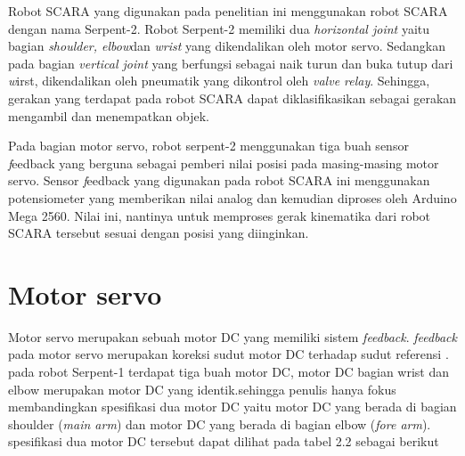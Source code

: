 Robot SCARA yang digunakan pada penelitian ini menggunakan robot SCARA dengan nama Serpent-2. Robot Serpent-2 memiliki dua \textit{horizontal joint} yaitu bagian \textit{shoulder, elbow}dan \textit{wrist} yang dikendalikan oleh motor servo. Sedangkan pada bagian \textit{vertical joint} yang berfungsi sebagai naik turun dan buka tutup dari \emph wirst, dikendalikan oleh pneumatik yang dikontrol oleh \emph {valve relay}. Sehingga, gerakan yang terdapat pada robot SCARA dapat diklasifikasikan sebagai gerakan mengambil dan menempatkan objek. 
\begin{table}[H]
	\centering
	\caption{Spesifikasi Robot Serpent-2}
		\end{table}
		
		Pada bagian motor servo, robot serpent-2 menggunakan tiga buah sensor \emph feedback yang berguna sebagai pemberi nilai posisi pada masing-masing motor servo. Sensor \emph feedback yang digunakan pada robot SCARA ini menggunakan potensiometer yang memberikan nilai analog dan kemudian diproses oleh Arduino Mega 2560. Nilai ini, nantinya untuk memproses gerak kinematika dari robot SCARA tersebut sesuai dengan posisi yang diinginkan.



\section{Motor servo}
	Motor servo merupakan sebuah motor DC yang memiliki sistem \textit{feedback}. \textit{feedback} pada motor servo merupakan koreksi sudut motor DC terhadap sudut referensi \cite{Younkin2002}. pada robot Serpent-1 terdapat tiga buah motor DC, motor DC	 bagian wrist dan elbow merupakan motor DC yang identik.sehingga penulis hanya fokus membandingkan spesifikasi dua motor DC yaitu motor DC yang berada di bagian shoulder (\textit{main arm}) dan motor DC yang berada di bagian elbow (\textit{fore arm}). spesifikasi dua motor DC tersebut dapat dilihat pada tabel 2.2 sebagai berikut

